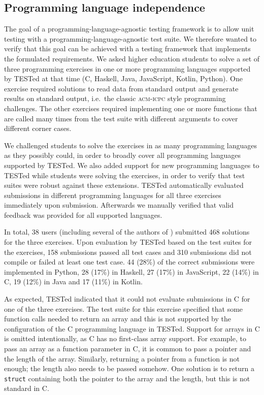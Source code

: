 \documentclass[../main]{subfiles}
\begin{document}
\subsection{Programming language independence}\label{subsec:programming-language-independence}

The goal of a programming-language-agnostic testing framework is to allow unit testing with a programming-language-agnostic test suite.
We therefore wanted to verify that this goal can be achieved with a testing framework that implements the formulated requirements.
We asked higher education students to solve a set of three programming exercises in one or more programming languages supported by TESTed at that time (C, Haskell, Java, JavaScript, Kotlin, Python).
One exercise required solutions to read data from standard output and generate results on standard output, i.e.\ the classic \textsc{acm-icpc} style programming challenges.
The other exercises required implementing one or more functions that are called many times from the test suite with different arguments to cover different corner cases.

We challenged students to solve the exercises in as many programming languages as they possibly could, in order to broadly cover all programming languages supported by TESTed.
We also added support for new programming languages to TESTed while students were solving the exercises, in order to verify that test suites were robust against these extensions.
TESTed automatically evaluated submissions in different programming languages for all three exercises immediately upon submission.
Afterwards we manually verified that valid feedback was provided for all supported languages.

In total, 38 users (including several of the authors of \textcite{strijbolTESTedEducationalTesting2023}) submitted 468 solutions for the three exercises.
Upon evaluation by TESTed based on the test suites for the exercises, 158 submissions passed all test cases and 310 submissions did not compile or failed at least one test case.
44 (28\%) of the correct submissions were implemented in Python, 28 (17\%) in Haskell, 27 (17\%) in JavaScript, 22 (14\%) in C, 19 (12\%) in Java and 17 (11\%) in Kotlin.

As expected, TESTed indicated that it could not evaluate submissions in C for one of the three exercises.
The test suite for this exercise specified that some function calls needed to return an array and this is not supported by the configuration of the C programming language in TESTed.
Support for arrays in C is omitted intentionally, as C has no first-class array support.
For example, to pass an array as a function parameter in C, it is common to pass a pointer and the length of the array.
Similarly, returning a pointer from a function is not enough;
the length also needs to be passed somehow.
One solution is to return a \texttt{struct} containing both the pointer to the array and the length, but this is not standard in C\@.
\end{document}
